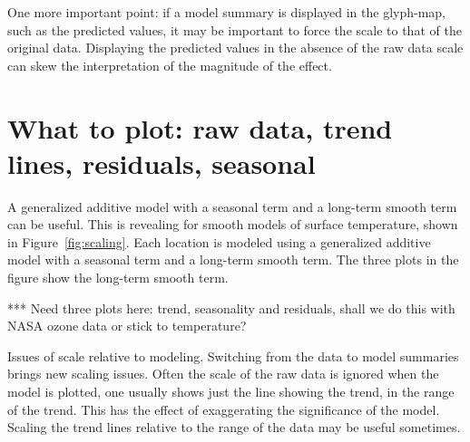 \documentclass[oneside]{article}
\begin{document}

One more important point: if a model summary is displayed in the glyph-map, such as the predicted values, it may be important to force the scale to that of the original data. Displaying the predicted values in the absence of the raw data scale can skew the interpretation of the magnitude of the effect. 

\section{What to plot: raw data, trend lines, residuals,  seasonal}

A generalized additive model \citep{wood:2006} with a seasonal term and a long-term smooth term can be useful. This is revealing for smooth models of surface temperature, shown in Figure~\ref{fig:scaling}. Each location is modeled using a generalized additive model \citep{wood:2006} with a seasonal term and a long-term smooth term. The three plots in the figure show the long-term smooth term. %


*** Need three plots here: trend, seasonality and residuals, shall we do this with NASA ozone data or stick to temperature?

Issues of scale relative to modeling. Switching from the data to model summaries brings new scaling issues. Often the scale of the raw data is ignored when the model is plotted, one usually shows just the line showing the trend, in the range of the trend. This has the effect of exaggerating the significance of the model. Scaling the trend lines relative to the range of the data may be useful sometimes.
\end{document}

